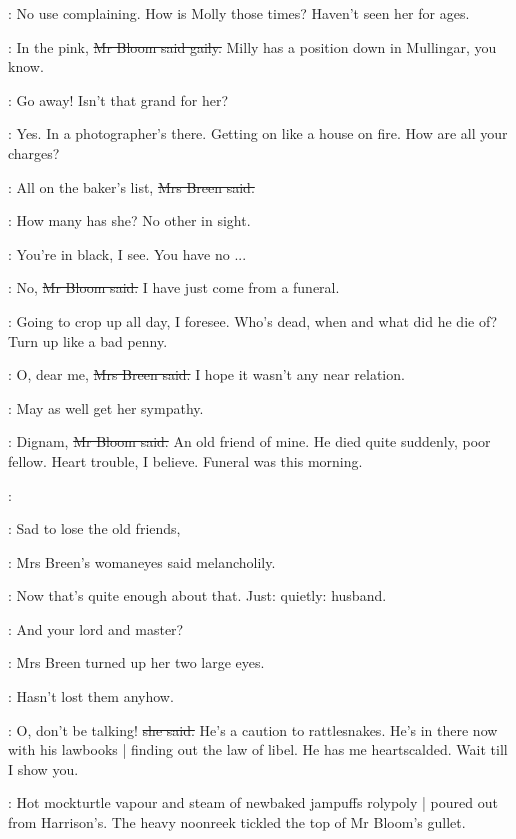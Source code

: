 \josie:
No use complaining.
How is Molly those times?
Haven't seen her for ages.

\Bloom:
In the pink,
\sout{Mr Bloom said gaily.}
Milly has a position down in Mullingar, you know.

\josie:
Go away!
Isn't that grand for her?

\Bloom:
Yes.
In a photographer's there.
Getting on like a house on fire.
How are all your charges?%

\josie:
All on the baker's list,
\sout{Mrs Breen said.}

\BloomInt:
How many has she?
No other in sight.

\josie:
You're in black, I see.
You have no ...

\Bloom:
No,
\sout{Mr Bloom said.}
I have just come from a funeral.

\BloomInt:
Going to crop up all day, I foresee.
Who's dead,
when and what did he die of?
Turn up like a bad penny.

\josie:
O, dear me,
\sout{Mrs Breen said.}
I hope it wasn't any near relation.

\BloomInt:
May as well get her sympathy.

\Bloom:
Dignam,
\sout{Mr Bloom said.}
An old friend of mine.
He died quite suddenly,
poor fellow.
Heart trouble, I believe.
Funeral was this morning.

\BloomInt:

\josie:
Sad to lose the old friends,

:
Mrs Breen's womaneyes said melancholily.

\BloomInt:
Now that's quite enough about that.
Just:
quietly:
husband.

\Bloom:
And your lord and master?

:
Mrs Breen turned up her two large eyes.

\BloomInt:
Hasn't lost them anyhow.

\josie:
O, don't be talking!
\sout{she said.}
He's a caution to rattlesnakes.
He's in there now with his lawbooks |
finding out the law of libel.
He has me heartscalded.
Wait till I show you.

:
Hot mockturtle vapour and steam of newbaked jampuffs rolypoly |
poured out from Harrison's.
The heavy noonreek tickled the top of Mr Bloom's gullet.

